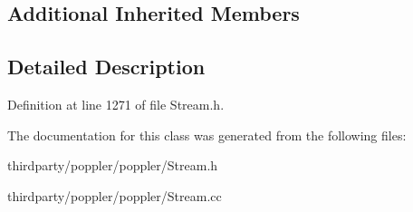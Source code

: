 \subsection*{Additional Inherited Members}


\subsection{Detailed Description}


Definition at line 1271 of file Stream.\+h.



The documentation for this class was generated from the following files\+:\begin{DoxyCompactItemize}
\item 
thirdparty/poppler/poppler/Stream.\+h\item 
thirdparty/poppler/poppler/Stream.\+cc\end{DoxyCompactItemize}
